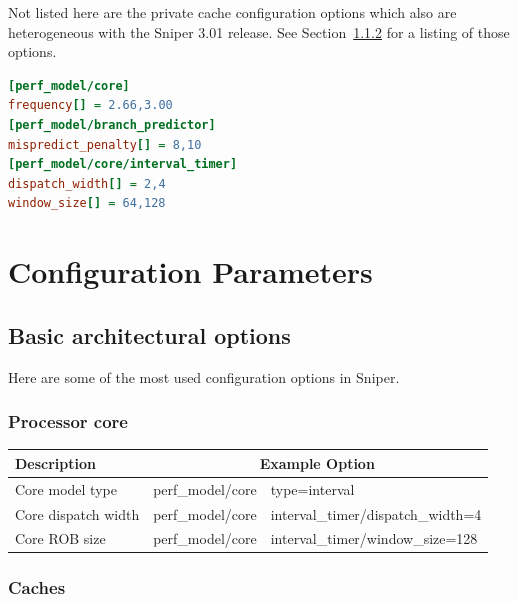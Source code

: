 \documentclass[a4paper,11pt,titlepage]{article}
\begin{document}
Not listed here are the private cache configuration options which also are heterogeneous with the Sniper 3.01
release. See Section~\ref{sec:config-basic-caches} for a listing of those options.

\begin{lstlisting}[label=lst:config-hetero-options,caption=A Selection of Heterogeneous Options,rulecolor=\color{DarkSlateBlue},language=ini]
[perf_model/core]
frequency[] = 2.66,3.00
[perf_model/branch_predictor]
mispredict_penalty[] = 8,10
[perf_model/core/interval_timer]
dispatch_width[] = 2,4
window_size[] = 64,128
\end{lstlisting}

\section{Configuration Parameters}

\subsection{Basic architectural options}

Here are some of the most used configuration options in Sniper.

\subsubsection{Processor core}

\begin{tabular}{lr@{/}l} \hline\hline
Description & \multicolumn{2}{c}{Example Option} \\ \hline
Core model type & perf\_model/core&type=interval \\
Core dispatch width & perf\_model/core&interval\_timer/dispatch\_width=4 \\
Core ROB size & perf\_model/core&interval\_timer/window\_size=128 \\
\hline
\end{tabular}

\subsubsection{Caches}
\label{sec:config-basic-caches}
\end{document}
